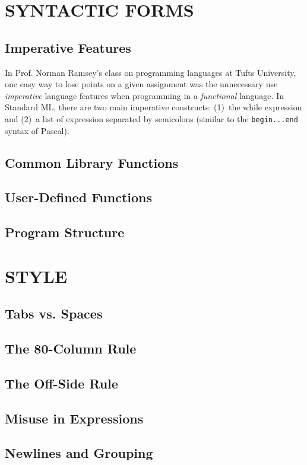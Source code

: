 \documentclass[12pt,abstracton]{scrartcl}
\begin{document}
\section{SYNTACTIC FORMS}\label{sec:syntax}
\subsection{Imperative Features}\label{subsec:imper}
In Prof. Norman Ramsey's class on programming languages at Tufts University, one easy way to lose points
on a given assignment was the unnecessary use \emph{imperative} language features when programming in a \emph{functional} language.
In Standard ML, there are two main imperative constructs:
(1)~the while expression and (2)~a list of expression separated by semicolons (similar to the \texttt{begin...end} syntax of Pascal)\cite{Ull98}.
\subsection{Common Library Functions}\label{subsec:imp}
\subsection{User-Defined Functions}\label{subsec:userfun}
\subsection{Program Structure}\label{subsec:struct}
\section{STYLE}\label{sec:style}
\subsection{Tabs vs. Spaces}
\subsection{The 80-Column Rule}
\subsection{The Off-Side Rule}
\subsection{Misuse in Expressions}
\subsection{Newlines and Grouping}
\end{document}
